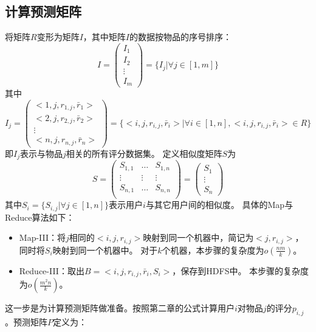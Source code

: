 \subsection{计算预测矩阵}
将矩阵$R$变形为矩阵$I$，其中矩阵$I$的数据按物品的序号排序：
\begin{equation}
I=\left(
\begin{array}{c}
I_1 \\
I_2 \\
\vdots \\
I_m
\end{array}
\right) = \{I_j|\forall j\in [1,m] \}
\end{equation}
其中
\begin{equation}
I_j=\left(
\begin{array}{c}
<1,j,r_{1,j},\bar{r}_1 > \\
<2,j,r_{2,j},\bar{r}_2 > \\
\vdots \\
<n,j,r_{n,j},\bar{r}_n >
\end{array}
\right) = \{<i,j,r_{i,j},\bar{r}_i >|\forall i\in [1,n], <i,j,r_{i,j},\bar{r}_i > \in R\}
\end{equation}
即$I_j$表示与物品$j$相关的所有评分数据集。
定义相似度矩阵$S$为
\begin{equation}
S=\left(
\begin{array}{ccc}
S_{1,1} & \ldots & S_{1,n} \\
\vdots & \vdots & \vdots \\
S_{n,1} & \ldots & S_{n,n} \\
\end{array}
\right) = \left(
\begin{array}{c}
S_1 \\
\vdots\\
S_n
\end{array}
\right)
\end{equation}
其中$S_i=\{S_{i,j}|\forall j\in [1,n] \}$表示用户$i$与其它用户间的相似度。
具体的Map与Reduce算法如下：
\begin{itemize}
\item Map-III：将$j$相同的$<i,j,r_{i,j}>$映射到同一个机器中，简记为$<j,r_{i,j}>$，同时将$S_i$映射到同一个机器中。
对于$k$个机器，本步骤的复杂度为$o(\frac{nm}{k})$。
\item Reduce-III：取出$B=<i,j,r_{i,j},\bar{r}_i ,S_i>$，保存到HDFS中。
本步骤的复杂度为$o(\frac{m^2n}{k})$。
\end{itemize}
这一步是为计算预测矩阵做准备。按照第二章的公式计算用户$i$对物品$j$的评分$p_{i,j}$。预测矩阵$P$定义为：
